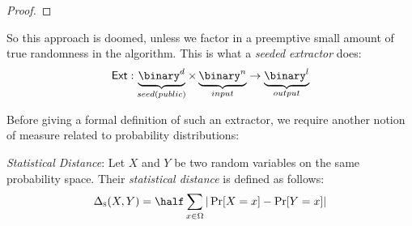 \begin{proof}

\end{proof}

So this approach is doomed, unless we factor in a preemptive small amount of true randomness in the algorithm. This is what a \emph{seeded extractor} does:
\[
    \ext: \underbrace{\binary^d}_{seed(public)}\times \underbrace{\binary^n}_{input} \to \underbrace{\binary^l}_{output}
\]

Before giving a formal definition of such an extractor, we require another notion of measure related to probability distributions:

\begin{definition} \emph{Statistical Distance}:
    Let $X$ and $Y$ be two random variables on the same probability space. Their \emph{statistical distance} is defined as follows:
    \[
        \statdist(X, Y) = \half\sum_{x \in \Omega}|\Pr[X = x] - \Pr[Y = x]|
    \]

\end{definition}

